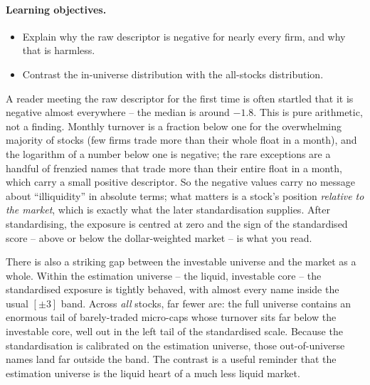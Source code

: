 \documentclass[11pt]{article}
\theoremstyle{definition}
\theoremstyle{plain}
\theoremstyle{remark}
\begin{document}
\paragraph{Learning objectives.}
\begin{itemize}[leftmargin=1.4em,topsep=2pt]
  \item Explain why the raw descriptor is negative for nearly every firm, and why that is harmless.
  \item Contrast the in-universe distribution with the all-stocks distribution.
\end{itemize}

A reader meeting the raw descriptor for the first time is often startled that it is negative almost everywhere -- the median is around $-1.8$. This is pure arithmetic, not a finding. Monthly turnover is a fraction below one for the overwhelming majority of stocks (few firms trade more than their whole float in a month), and the logarithm of a number below one is negative; the rare exceptions are a handful of frenzied names that trade more than their entire float in a month, which carry a small positive descriptor. So the negative values carry no message about ``illiquidity'' in absolute terms; what matters is a stock's position \emph{relative to the market}, which is exactly what the later standardisation supplies. After standardising, the exposure is centred at zero and the sign of the standardised score -- above or below the dollar-weighted market -- is what you read.

There is also a striking gap between the investable universe and the market as a whole. Within the estimation universe -- the liquid, investable core -- the standardised exposure is tightly behaved, with almost every name inside the usual $[\pm 3]$ band. Across \emph{all} stocks, far fewer are: the full universe contains an enormous tail of barely-traded micro-caps whose turnover sits far below the investable core, well out in the left tail of the standardised scale. Because the standardisation is calibrated on the estimation universe, those out-of-universe names land far outside the band. The contrast is a useful reminder that the estimation universe is the liquid heart of a much less liquid market.
\end{document}

